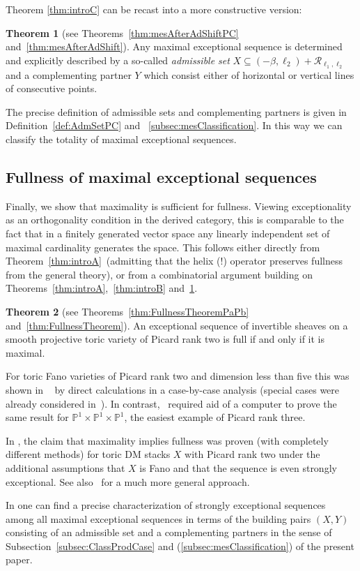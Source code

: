 \documentclass[11pt]{article}
\theoremstyle{definition}
\numberwithin{equation}{section}
\newcommand{\PP}{\mathbb P}
\newcommand{\CR}{{\mathcal R}}
\newcommand{\xb}{\beta}
\newcommand{\Rect}{\CR}
\newcommand{\mes}{maximal exceptional sequence}
\newcommand{\ssect}[1]{Subsection~\ref{#1}}
\newcommand{\thLex}{\ref{thm:introA}}
\newcommand{\thHeight}{\ref{thm:introB}}
\newcommand{\thHelex}{\ref{thm:introC}}
\newcommand{\thClass}{\ref{thm:introD}}
\newtheorem{main}{Theorem}
\begin{document}
{Theorem {\thHelex} can be recast into a 
more constructive version:}

\begin{main} [{see Theorems~\ref{thm:mesAfterAdShiftPC} and~\ref{thm:mesAfterAdShift}}] \label{thm:introD}
Any {\mes} is determined {and explicitly described}
by a so-called 
{\em admissible set} $X\subseteq(-\xb,\ell_2)
+\Rect_{\ell_1,\ell_2}$ 
and a complementing partner $Y$ which consist either 
of horizontal or vertical lines of consecutive 
points.
 \end{main}

The precise definition of admissible set{s and complementing partners} 
is given in Definition~\ref{def:AdmSetPC} and
~\ref{subsec:mesClassification}. In this way 
we can classify the totality of {\mes}s.

\subsection{Fullness of maximal exceptional sequences}
\label{subsubsec:FullnessExSeq}
{Finally, we show that maximality is 
sufficient for fullness. Viewing exceptionality 
as an orthogonality condition in the derived 
category, this is comparable to the fact that 
in a finitely generated vector space any linearly 
independent set of maximal cardinality generates 
the space. This follows either directly from Theorem~\thLex\ 
(admitting that the helix (!) operator preserves fullness 
from the general theory), or from a combinatorial argument 
building on Theorems~{\thLex},~{\thHeight} and~{\thClass}.} 

 \begin{main} [{see Theorems~\ref{thm:FullnessTheoremPaPb} and~\ref{thm:FullnessTheorem}}] \label{thm:introE}
An exceptional sequence of invertible sheaves 
on a smooth projective toric variety of Picard rank 
two is full if and only if it is maximal.
 \end{main}

For toric Fano varieties of Picard rank two and 
dimension less than five this was shown in
~\cite{pic2Fano} by direct calculations in a 
case-by-case analysis {(special cases were 
already considered in~\cite{LiuYangYu})}. 
{In contrast},~\cite{p1p1p1} required aid of a computer to 
prove the same result for $\PP^1\times\PP^1\times\PP^1$, 
the easiest example of Picard rank three.
{
In \cite{BorisovWang}, the claim that maximality implies fullness
was proven (with completely different methods) 
for toric DM stacks $X$ with Picard rank two under the additional
assumptions that $X$ is Fano and that the sequence is even 
strongly exceptional. See also~\cite{DHLKK} for a much more general approach.

In \cite[Theorem 5.3]{exsec} one can find a precise characterization 
of strongly exceptional sequences among all \mes s
in terms of the building pairs $(X,Y)$ consisting of an admissible set and a
complementing partners in the sense of
\ssect{subsec:ClassProdCase} and (\ref{subsec:mesClassification}) 
of the present paper.
}
\end{document}
